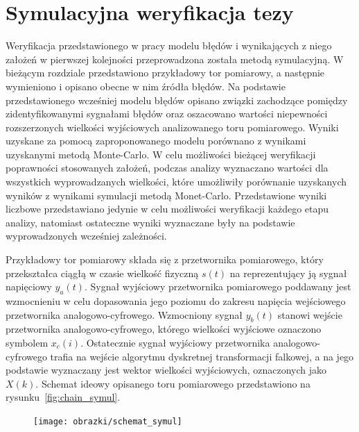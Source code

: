 \chapter{Symulacyjna weryfikacja tezy}

Weryfikacja przedstawionego w pracy modelu błędów i wynikających z niego założeń w pierwszej kolejności przeprowadzona została metodą symulacyjną. W bieżącym rozdziale przedstawiono przykładowy tor pomiarowy, a następnie wymieniono i opisano obecne w nim źródła błędów. Na podstawie przedstawionego wcześniej modelu błędów opisano związki zachodzące pomiędzy zidentyfikowanymi sygnałami błędów oraz oszacowano wartości niepewności rozszerzonych wielkości wyjściowych analizowanego toru pomiarowego. Wyniki uzyskane za pomocą zaproponowanego modelu porównano z wynikami uzyskanymi metodą Monte-Carlo. W celu możliwości bieżącej weryfikacji poprawności stosowanych założeń, podczas analizy wyznaczano wartości dla wszystkich wyprowadzanych wielkości, które umożliwiły porównanie uzyskanych wyników z wynikami symulacji metodą Monet-Carlo. Przedstawione wyniki liczbowe przedstawiano jedynie w celu możliwości weryfikacji każdego etapu analizy, natomiast ostateczne wyniki wyznaczane były na podstawie wyprowadzonych wcześniej zależności.

Przykładowy tor pomiarowy składa się z przetwornika pomiarowego, który przekształca ciągłą w czasie wielkość fizyczną $s(t)$ na reprezentujący ją sygnał napięciowy $y_{a}(t)$. Sygnał wyjściowy przetwornika pomiarowego poddawany jest wzmocnieniu w celu dopasowania jego poziomu do zakresu napięcia wejściowego przetwornika analogowo-cyfrowego. Wzmocniony sygnał $y_{b}(t)$ stanowi wejście przetwornika analogowo-cyfrowego, którego wielkości wyjściowe oznaczono symbolem $x_{c}(i)$. Ostatecznie sygnał wyjściowy przetwornika analogowo-cyfrowego trafia na wejście algorytmu dyskretnej transformacji falkowej, a na jego podstawie wyznaczany jest wektor wielkości wyjściowych, oznaczonych jako $X(k)$. Schemat ideowy opisanego toru pomiarowego przedstawiono na rysunku~\ref{fig:chain_symul}.

\begin{figure}[htb!]
\begin{center}
\texttt{[image: obrazki/schemat\_symul]}
\end{center}
\end{figure}

